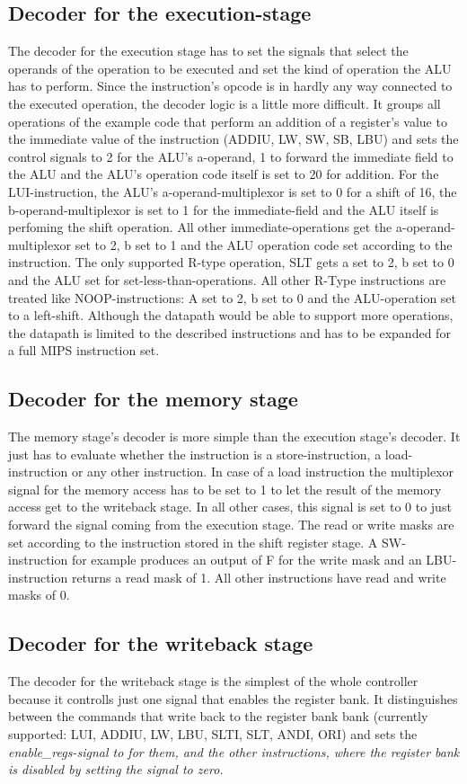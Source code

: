 \subsection{Decoder for the execution-stage}
The decoder for the execution stage has to set the signals that select the operands of the operation to be executed and set the kind of operation the ALU has to perform. Since the instruction's opcode is in hardly any way connected to the executed operation, the decoder logic is a little more difficult. It groups all operations of the example code that perform an addition of a register's value to the immediate value of the instruction (ADDIU, LW, SW, SB, LBU) and sets the control signals to 2 for the ALU's a-operand, 1 to forward the immediate field to the ALU and the ALU's operation code itself is set to 20 for addition. For the LUI-instruction, the ALU's a-operand-multiplexor is set to 0 for a shift of 16, the b-operand-multiplexor is set to 1 for the immediate-field and the ALU itself is perfoming the shift operation. All other immediate-operations get the a-operand-multiplexor set to 2, b set to 1 and the ALU operation code set according to the instruction. The only supported R-type operation, SLT gets a set to 2, b set to 0 and the ALU set for set-less-than-operations. All other R-Type instructions are treated like NOOP-instructions: A set to 2, b set to 0 and the ALU-operation set to a left-shift. Although the datapath would be able to support more operations, the datapath is limited to the described instructions and has to be expanded for a full MIPS instruction set.
\subsection{Decoder for the memory stage}
The memory stage's decoder is more simple than the execution stage's decoder. It just has to evaluate whether the instruction is a store-instruction, a load-instruction or any other instruction. In case of a load instruction the multiplexor signal for the memory access has to be set to 1 to let the result of the memory access get to the writeback stage. In all other cases, this signal is set to 0 to just forward the signal coming from the execution stage. The read or write masks are set according to the instruction stored in the shift register stage. A SW-instruction for example produces an output of F for the write mask and an LBU-instruction returns a read mask of 1. All other instructions have read and write masks of 0.
\subsection{Decoder for the writeback stage}
The decoder for the writeback stage is the simplest of the whole controller because it controlls just one signal that enables the register bank. It distinguishes between the commands that write back to the register bank bank (currently supported: LUI, ADDIU, LW, LBU, SLTI, SLT, ANDI, ORI) and sets the \em enable_regs\em -signal to for them, and the other instructions, where the register bank is disabled by setting the signal to zero. 